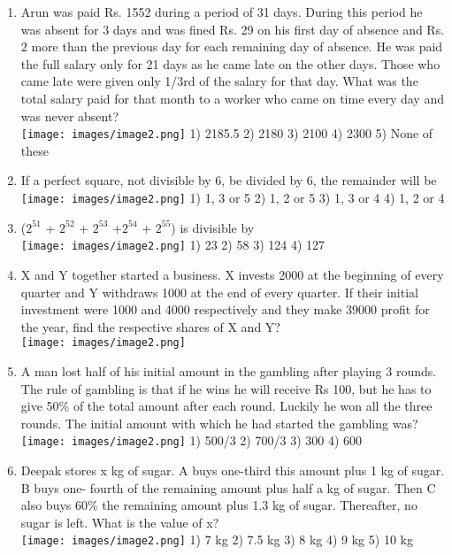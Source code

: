 \documentclass[
]{article}
\begin{document}
\begin{enumerate}
\item Arun was paid Rs. 1552 during a period of 31 days. During this period he was absent for 3 days and was fined Rs. 29 on his first day of absence and Rs. 2 more than the previous day for each remaining day of absence. He was paid the full salary only for 21 days as he came late on the other days. Those who came late were given only 1/3rd of the salary for that day. What was the total salary paid for that month to a worker who came on time every day and was never absent? \\
\texttt{[image: images/image2.png]} 1) 2185.5 2) 2180 3) 2100 4) 2300 5) None of these

\item If a perfect square, not divisible by 6, be divided by 6, the remainder will be \\
\texttt{[image: images/image2.png]} 1) 1, 3 or 5 2) 1, 2 or 5 3) 1, 3 or 4 4) 1, 2 or 4

\item ($ 2^{51} $ + $ 2^{52} $ + $2^{53}  $ +$ 2^{54} $ + $ 2^{55} $) is divisible by \\
\texttt{[image: images/image2.png]} 1) 23 2) 58 3) 124 4) 127


\item X and Y together started a business. X invests 2000 at the beginning of every quarter and Y withdraws 1000 at the end of every quarter. If their initial investment were 1000 and 4000 respectively and they make 39000 profit for the year, find the respective shares of X and Y? \\
\texttt{[image: images/image2.png]}


\item A man lost half of his initial amount in the gambling after playing 3 rounds. The rule of gambling is that if he wins he will receive Rs 100, but he has to give 50\% of the total amount after each round. Luckily he won all the three rounds. The initial amount with which he had started the gambling was? \\
\texttt{[image: images/image2.png]} 1) 500/3 2) 700/3 3) 300 4) 600




\item Deepak stores x kg of sugar. A buys one-third this amount plus 1 kg of sugar. B buys one- fourth of the remaining amount plus half a kg of sugar. Then C also buys 60\% the remaining amount plus 1.3 kg of sugar. Thereafter, no sugar is left. What is the value of x? \\
\texttt{[image: images/image2.png]} 1) 7 kg 2) 7.5 kg 3) 8 kg 4) 9 kg 5) 10 kg


\end{enumerate}
\end{document}
